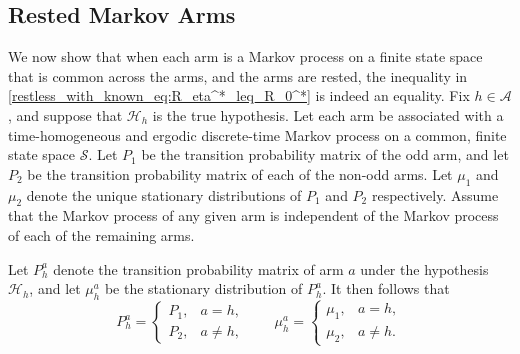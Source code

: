 \subsection{Rested Markov Arms}\label{restless_with_known_subsec:rested_markov_arms}
We now show that when each arm is a Markov process on a finite state space that is common across the arms, and the arms are rested, the inequality in \eqref{restless_with_known_eq:R_eta^*_leq_R_0^*} is indeed an equality. Fix $h\in\mathcal{A}$, and suppose that $\mathcal{H}_h$ is the true hypothesis. Let each arm be associated with a time-homogeneous and ergodic discrete-time Markov process on a common, finite state space $\mathcal{S}$. Let $P_1$ be the transition probability matrix of the odd arm, and let $P_2$ be the transition probability matrix of each of the non-odd arms. Let $\mu_1$ and $\mu_2$ denote the unique stationary distributions of $P_1$ and $P_2$ respectively. Assume that the Markov process of any given arm is independent of the Markov process of each of the remaining arms.

Let $P_h^a$ denote the transition probability matrix of arm $a$ under the hypothesis $\mathcal{H}_h$, and let $\mu_h^a$ be the stationary distribution of $P_h^a$. It then follows that
\begin{equation}
	P_h^a=\begin{cases}
		P_1,& a=h,\\
		P_2,& a\neq h,
	\end{cases}\quad \quad  \mu_h^a=\begin{cases}
		\mu_1,& a=h,\\
		\mu_2,& a\neq h.
	\end{cases}\label{restless_with_known_eq:P_h^a_and_mu_h^a}
\end{equation}

